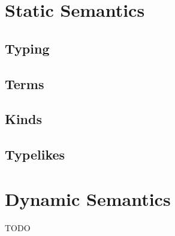 \documentclass{article}
\begin{document}
\section{Static Semantics}

\subsection{Typing}


\subsection{Terms}


\subsection{Kinds}


\subsection{Typelikes}


\section{Dynamic Semantics}
TODO
\end{document}
